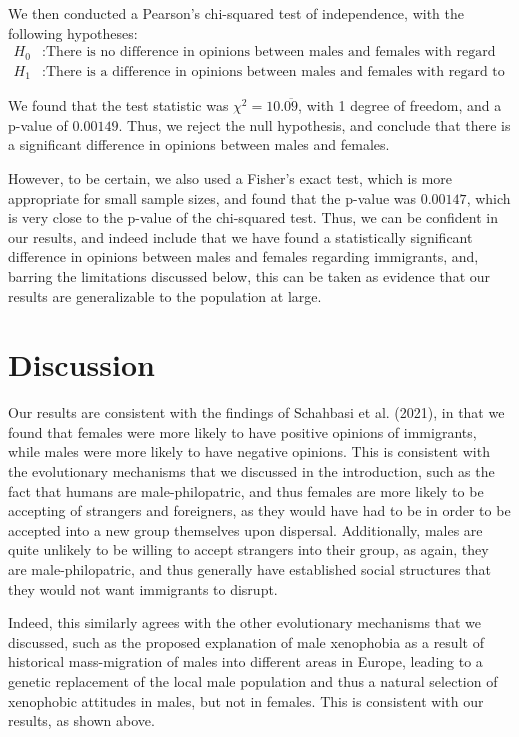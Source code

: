 \documentclass{article}
\begin{document}
We then conducted a Pearson's chi-squared test of independence, with the following hypotheses:
\begin{align*}
    H_0 &: \text{There is no difference in opinions between males and females with regard to immigrants.} \\
    H_1 &: \text{There is a difference in opinions between males and females with regard to immigrants.}
\end{align*}

We found that the test statistic was $\chi^2 = 10.\overline{09}$, with 1 degree of freedom, and a p-value of $0.00149$. Thus, we reject the null hypothesis, and conclude that there is a significant difference in opinions between males and females. 

However, to be certain, we also used a Fisher's exact test, which is more appropriate for small sample sizes, and found that the p-value was $0.00147$, which is very close to the p-value of the chi-squared test. Thus, we can be confident in our results, and indeed include that we have found a statistically significant difference in opinions between males and females regarding immigrants, and, barring the limitations discussed below, this can be taken as evidence that our results are generalizable to the population at large.

\section{Discussion}

Our results are consistent with the findings of Schahbasi et al. (2021), in that we found that females were more likely to have positive opinions of immigrants, while males were more likely to have negative opinions. This is consistent with the evolutionary mechanisms that we discussed in the introduction, such as the fact that humans are male-philopatric\cite{malePhilopatry}, and thus females are more likely to be accepting of strangers and foreigners, as they would have had to be in order to be accepted into a new group themselves upon dispersal. Additionally, males are quite unlikely to be willing to accept strangers into their group, as again, they are male-philopatric, and thus generally have established social structures that they would not want immigrants to disrupt.

Indeed, this similarly agrees with the other evolutionary mechanisms that we discussed\cite{immigrantOpinions}, such as the proposed explanation of male xenophobia as a result of historical mass-migration of males into different areas in Europe, leading to a genetic replacement of the local male population and thus a natural selection of xenophobic attitudes in males, but not in females. This is consistent with our results, as shown above.
\end{document}
